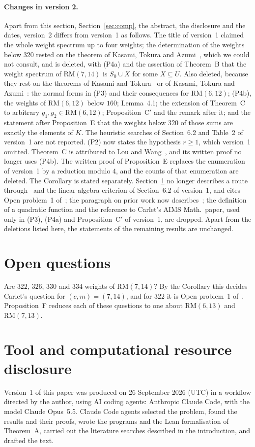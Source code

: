 \documentclass[11pt]{article}
\theoremstyle{remark}
\newcommand{\RM}{\mathrm{RM}}
\begin{document}
\paragraph{Changes in version 2.}
Apart from this section, Section~\ref{sec:comp}, the abstract, the disclosure
and the dates, version~2 differs from version~1 as follows. The title of
version~1 claimed the whole weight spectrum up to four weights; the
determination of the weights below $320$ rested on the theorem of Kasami,
Tokura and Azumi~\cite{kta}, which we could not consult, and is deleted, with
(P4a) and the assertion of Theorem~B that the weight spectrum of $\RM(7,14)$
is $S_0\cup X$ for some $X\subseteq U$. Also deleted, because they rest on the
theorems of Kasami and Tokura~\cite{kt} or of Kasami, Tokura and
Azumi~\cite{kta}: the normal forms in (P3) and their consequences for
$\RM(6,12)$; (P4b), the weights of $\RM(6,12)$ below $160$; Lemma~4.1;
the extension of Theorem~C to arbitrary $g_1,g_2\in\RM(6,12)$;
Proposition~C$'$ and the remark after it; and the statement after
Proposition~E that the weights below $320$ of those sums are exactly the
elements of $K$. The heuristic searches of Section~6.2 and Table~2 of
version~1 are not reported. (P2) now states the hypothesis $r\ge1$, which
version~1 omitted. Theorem~C is attributed to Lou and Wang~\cite{lw2}, and its
written proof no longer uses (P4b). The written proof of Proposition~E replaces
the enumeration of version~1 by a reduction modulo $4$, and the counts of that
enumeration are deleted. The Corollary is stated separately.
Section~\ref{sec:open} no longer describes a route through~\cite{kta} and the
linear-algebra criterion of Section~6.2 of version~1, and cites Open
problem~1 of~\cite{lw2}; the paragraph on prior work now describes~\cite{lw2};
the definition of a quadratic function and the reference to Carlet's AIMS
Math.\ paper, used only in (P3), (P4a) and Proposition~C$'$ of version~1, are
dropped. Apart from the deletions listed here, the statements of the
remaining results are unchanged.

\section{Open questions}\label{sec:open}
Are $322$, $326$, $330$ and $334$ weights of $\RM(7,14)$? By the Corollary this
decides Carlet's question for $(c,m)=(7,14)$, and for $322$ it is Open
problem~1 of~\cite{lw2}. Proposition~F reduces each of these questions to one
about $\RM(6,13)$ and $\RM(7,13)$.

\section*{Tool and computational resource disclosure}
Version~1 of this paper was produced on 26 September 2026 (UTC) in a workflow
directed by the author, using AI coding agents: Anthropic Claude Code, with
the model Claude Opus~5.5. Claude Code agents selected the problem, found the
results and their proofs, wrote the programs and the Lean formalisation of
Theorem~A, carried out the literature searches described in the introduction,
and drafted the text.
\end{document}

